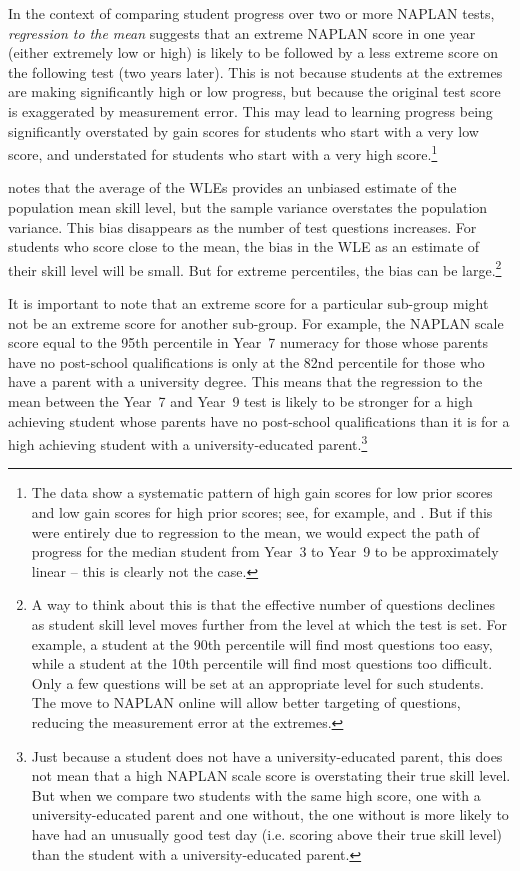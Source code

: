 In the context of comparing student progress over two or more NAPLAN tests, \textit{regression to the mean} suggests that an extreme NAPLAN score in one year (either extremely low or high) is likely to be followed by a less extreme score on the following test (two years later). This is not because students at the extremes are making significantly high or low progress, but because the original test score is exaggerated by measurement error. This may lead to learning progress being significantly overstated by gain scores for students who start with a very low score, and understated for students who start with a very high score.\footnote{The data show a systematic pattern of high gain scores for low prior scores and low gain scores for high prior scores; see, for example,  and . But if this were entirely due to regression to the mean, we would expect the path of progress for the median student from \mbox{Year 3} to \mbox{Year 9} to be approximately linear -- this is clearly not the case.}

\textcite{wu2005} notes that the average of the WLEs provides an unbiased estimate of the population mean skill level, but the sample variance overstates the population variance. This bias disappears as the number of test questions increases. For students who score close to the mean, the bias in the WLE as an estimate of their skill level will be small. But for extreme percentiles, the bias can be large.\footnote{A way to think about this is that the effective number of questions declines as student skill level moves further from the level at which the test is set. For example, a student at the 90th percentile will find most questions too easy, while a student at the 10th percentile will find most questions too difficult. Only a few questions will be set at an appropriate level for such students. The move to NAPLAN online will allow better targeting of questions, reducing the measurement error at the extremes.}

It is important to note that an extreme score for a particular sub-group might not be an extreme score for another sub-group. For example, the NAPLAN scale score equal to the 95th percentile in \mbox{Year 7} numeracy for those whose parents have no post-school qualifications is only at the 82nd percentile for those who have a parent with a university degree. This means that the regression to the mean between the \mbox{Year 7} and \mbox{Year 9} test is likely to be stronger for a high achieving student whose parents have no post-school qualifications than it is for a high achieving student with a university-educated parent.\footnote{Just because a student does not have a university-educated parent, this does not mean that a high NAPLAN scale score is overstating their true skill level. But when we compare two students with the same high score, one with a university-educated parent and one without, the one without is more likely to have had an unusually good test day (i.e. scoring above their true skill level) than the student with a university-educated parent.}

